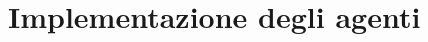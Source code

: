 \chapter*{Implementazione degli agenti}
\graphicspath{{Chapter5/Chapter5Figs/PNG/}{Chapter5/Chapter5Figs/PDF/}{Chapter5/Chapter5Figs/}}
